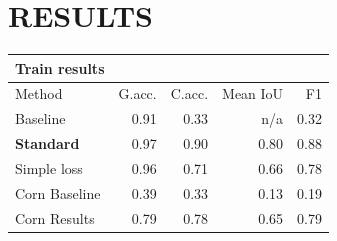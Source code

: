 \documentclass{article}
\begin{document}
\section{RESULTS}
\label{sec:illust}

\begin{table}[!htb]
	\centering
	\begin{tabular}{l r r r r}
		\textbf{Train results} & & & & \\
		\toprule
		Method  &  G.acc.  &  C.acc.  &  Mean IoU  &  F1 \\ \midrule
		Baseline  &  0.91  &  0.33  &  n/a  &  0.32 \\
		\textbf{Standard}  &  0.97  &  0.90  &  0.80  &  0.88 \\
		Simple loss   &  0.96  &  0.71  &  0.66  &  0.78 \\
		\midrule 
		Corn Baseline  &  0.39  &  0.33  &  0.13  &  0.19 \\
		Corn Results  &  0.79  &  0.78  &  0.65  &  0.79 \\
		\bottomrule
	\end{tabular}
\end{table}
\end{document}
